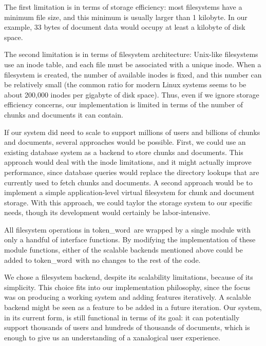 \documentclass{acm_proc_article-sp}
\newcommand{\tw}{token\_word}
\begin{document}
The first limitation is in terms of storage efficiency:  most filesystems have a minimum file size, and this minimum is usually larger than 1 kilobyte.
In our example, 33 bytes of document data would occupy at least a kilobyte of disk space.

The second limitation is in terms of filesystem architecture:  Unix-like filesystems use an inode table, and each file must be associated with a unique inode.
When a filesystem is created, the number of available inodes is fixed, and this number can be relatively small (the common ratio for modern Linux systems seems to be about 200,000 inodes per gigabyte of disk space). \cite{OperatingSystems}
Thus, even if we ignore storage efficiency concerns, our implementation is limited in terms of the number of chunks and documents it can contain.

If our system did need to scale to support millions of users and billions of chunks and documents, several approaches would be possible.
First, we could use an existing database system as a backend to store chunks and documents.
This approach would deal with the inode limitations, and it might actually improve performance, since database queries would replace the directory lookups that are currently used to fetch chunks and documents.
A second approach would be to implement a simple application-level virtual filesystem for chunk and document storage.
With this approach, we could taylor the storage system to our specific needs, though its development would certainly be labor-intensive.

All filesystem operations in \tw \  are wrapped by a single module with only a handful of interface functions.
By modifying the implementation of these module functions, either of the scalable backends mentioned above could be added to \tw \  with no changes to the rest of the code. 

We chose a filesystem backend, despite its scalability limitations, because of its simplicity.
This choice fits into our implementation philosophy, since the focus was on producing a working system and adding features iteratively.
A scalable backend might be seen as a feature to be added in a future iteration.
Our system, in its current form, is still functional in terms of its goal:  it can potentially support thousands of users and hundreds of thousands of documents, which is enough to give us an understanding of a xanalogical user experience.


\end{document}
